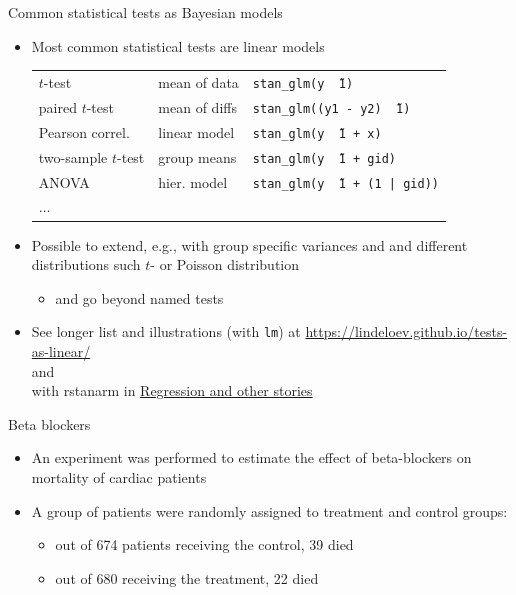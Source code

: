 \documentclass[english,t]{beamer}
\begin{document}
\begin{frame}{Common statistical tests as Bayesian models}

  \begin{itemize}
  \item Most common statistical tests are linear models\\
    \vspace{0.5\baselineskip}
    \hspace{-0.8cm}\begin{minipage}[t]{1.0\linewidth}
      {\small
        \begin{tabular}{lll}
          $t$-test & mean of data & {\tt stan\_glm(y \~\ 1)}\\
          paired $t$-test & mean of diffs &{\tt stan\_glm((y1 - y2) \~\  1)}\\
          Pearson correl. & linear model &{\tt stan\_glm(y \~\  1 + x)}\\
          two-sample $t$-test & group means &{\tt stan\_glm(y \~\  1 + gid)}\\
          ANOVA & hier. model &{\tt stan\_glm(y \~\  1 + (1 | gid))}\\
          $\ldots$ &
        \end{tabular}}
      \end{minipage}
  \item<2->  Possible to extend, e.g., with group specific variances and and
    different distributions such $t$- or Poisson distribution
    \begin{itemize}
    \item and go beyond named tests
    \end{itemize}
  \item<3-> See longer list and illustrations (with {\tt lm}) at
  \url{https://lindeloev.github.io/tests-as-linear/}\\
  and\\
  with rstanarm in \href{https://avehtari.github.io/ROS-Examples/}{Regression and other stories}
\end{itemize}

\end{frame}

\begin{frame}[fragile]{Beta blockers}

\begin{itemize}
  \item An experiment was performed to estimate the effect of
    beta-blockers on mortality of cardiac patients
  \item A group of
    patients were randomly assigned to treatment and control groups:
    \begin{itemize}
    \item out of 674 patients receiving the control, 39 died
    \item out of 680 receiving the treatment, 22 died
    \end{itemize}
  \end{itemize}

\end{frame}
\end{document}
